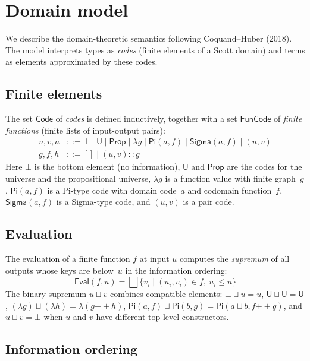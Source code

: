 \documentclass[11pt]{article}
\newcommand{\U}{\mathsf{U}}
\newcommand{\Prop}{\mathsf{Prop}}
\newcommand{\PiC}[2]{\mathsf{Pi}(#1,#2)}
\newcommand{\SigmaC}[2]{\mathsf{Sigma}(#1,#2)}
\newcommand{\FinEl}{\mathsf{Code}}
\newcommand{\FinFun}{\mathsf{FunCode}}
\newcommand{\EvalFun}{\mathsf{Eval}}
\newcommand{\Bot}{\bot}
\begin{document}
\section{Domain model}

We describe the domain-theoretic semantics following Coquand--Huber (2018).
The model interprets types as \emph{codes} (finite elements of a Scott domain)
and terms as elements approximated by these codes.

\subsection{Finite elements}

The set $\FinEl$ of \emph{codes} is defined inductively, together with
a set $\FinFun$ of \emph{finite functions} (finite lists of input-output pairs):
\begin{align*}
  u,v,a &::= \Bot \mid \U \mid \Prop \mid \lambda g \mid \PiC{a}{f}
              \mid \SigmaC{a}{f} \mid (u,v) \\
  g,f,h &::= [] \mid (u,v) :: g
\end{align*}
Here $\Bot$ is the bottom element (no information), $\U$ and $\Prop$ are
the codes for the universe and the propositional universe, $\lambda g$
is a function value with finite graph~$g$, $\PiC{a}{f}$ is a Pi-type code
with domain code~$a$ and codomain function~$f$, $\SigmaC{a}{f}$ is a
Sigma-type code, and $(u,v)$ is a pair code.

\subsection{Evaluation}

The evaluation of a finite function $f$ at input $u$ computes the
\emph{supremum} of all outputs whose keys are below~$u$ in the
information ordering:
\[
  \EvalFun(f, u) = \bigsqcup\{ v_i \mid (u_i, v_i) \in f,\ u_i \leq u \}
\]
The binary supremum $u \sqcup v$ combines compatible elements:
$\Bot \sqcup u = u$, $\U \sqcup \U = \U$,
$(\lambda g) \sqcup (\lambda h) = \lambda(g \mathbin{+\!+} h)$,
$\PiC{a}{f} \sqcup \PiC{b}{g} = \PiC{a \sqcup b}{f \mathbin{+\!+} g}$,
and $u \sqcup v = \Bot$ when $u$ and $v$ have different top-level constructors.

\subsection{Information ordering}
\end{document}
